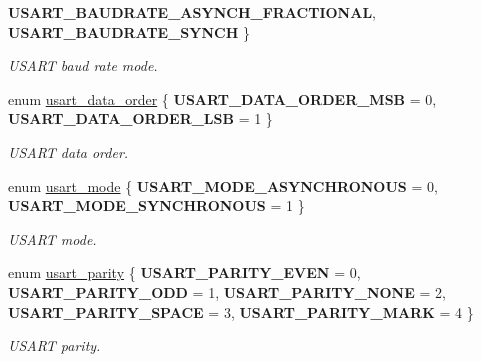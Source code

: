 \begin{DoxyCompactItemize}
{\bfseries U\+S\+A\+R\+T\+\_\+\+B\+A\+U\+D\+R\+A\+T\+E\+\_\+\+A\+S\+Y\+N\+C\+H\+\_\+\+F\+R\+A\+C\+T\+I\+O\+N\+AL}, 
{\bfseries U\+S\+A\+R\+T\+\_\+\+B\+A\+U\+D\+R\+A\+T\+E\+\_\+\+S\+Y\+N\+CH}
 \}\begin{DoxyCompactList}\small\item\em U\+S\+A\+RT baud rate mode. \end{DoxyCompactList}
\item 
\mbox{\label{group___h_p_l_ga426849bbd9655cec091101ebc9123eb4}} 
enum \hyperlink{group___h_p_l_ga426849bbd9655cec091101ebc9123eb4}{usart\+\_\+data\+\_\+order} \{ {\bfseries U\+S\+A\+R\+T\+\_\+\+D\+A\+T\+A\+\_\+\+O\+R\+D\+E\+R\+\_\+\+M\+SB} = 0, 
{\bfseries U\+S\+A\+R\+T\+\_\+\+D\+A\+T\+A\+\_\+\+O\+R\+D\+E\+R\+\_\+\+L\+SB} = 1
 \}\begin{DoxyCompactList}\small\item\em U\+S\+A\+RT data order. \end{DoxyCompactList}
\item 
\mbox{\label{group___h_p_l_ga1c465965478e0f6908a4c99d4f3ad20f}} 
enum \hyperlink{group___h_p_l_ga1c465965478e0f6908a4c99d4f3ad20f}{usart\+\_\+mode} \{ {\bfseries U\+S\+A\+R\+T\+\_\+\+M\+O\+D\+E\+\_\+\+A\+S\+Y\+N\+C\+H\+R\+O\+N\+O\+US} = 0, 
{\bfseries U\+S\+A\+R\+T\+\_\+\+M\+O\+D\+E\+\_\+\+S\+Y\+N\+C\+H\+R\+O\+N\+O\+US} = 1
 \}\begin{DoxyCompactList}\small\item\em U\+S\+A\+RT mode. \end{DoxyCompactList}
\item 
\mbox{\label{group___h_p_l_ga867cc5f0ea7d3bf651d68f0046cf6f41}} 
enum \hyperlink{group___h_p_l_ga867cc5f0ea7d3bf651d68f0046cf6f41}{usart\+\_\+parity} \{ \newline
{\bfseries U\+S\+A\+R\+T\+\_\+\+P\+A\+R\+I\+T\+Y\+\_\+\+E\+V\+EN} = 0, 
{\bfseries U\+S\+A\+R\+T\+\_\+\+P\+A\+R\+I\+T\+Y\+\_\+\+O\+DD} = 1, 
{\bfseries U\+S\+A\+R\+T\+\_\+\+P\+A\+R\+I\+T\+Y\+\_\+\+N\+O\+NE} = 2, 
{\bfseries U\+S\+A\+R\+T\+\_\+\+P\+A\+R\+I\+T\+Y\+\_\+\+S\+P\+A\+CE} = 3, 
\newline
{\bfseries U\+S\+A\+R\+T\+\_\+\+P\+A\+R\+I\+T\+Y\+\_\+\+M\+A\+RK} = 4
 \}\begin{DoxyCompactList}\small\item\em U\+S\+A\+RT parity. \end{DoxyCompactList}

\end{DoxyCompactItemize}
